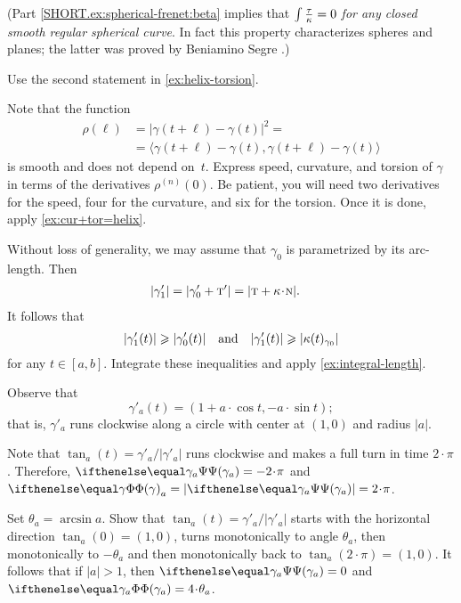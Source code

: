 \begin{multicols}{2}
(Part \ref{SHORT.ex:spherical-frenet:beta} implies that \textit{$\int\tfrac{\tau}{\kappa}=0$ for any closed smooth regular spherical curve}.
In fact this property characterizes spheres and planes; the latter was proved by Beniamino Segre \cite{segre}.)

 Use the second statement in \ref{ex:helix-torsion}.

 Note that the function
\begin{align*}
\rho(\ell)&=|\gamma(t+\ell)-\gamma(t)|^2=
\\
&=\langle \gamma(t+\ell)-\gamma(t),\gamma(t+\ell)-\gamma(t)\rangle
\end{align*}
is smooth and does not depend on~$t$.
Express speed, curvature, and torsion of $\gamma$ in terms of the derivatives $\rho^{(n)}(0)$.
Be patient, you will need two derivatives for the speed,
four for the curvature,
and six for the torsion.
Once it is done, apply \ref{ex:cur+tor=helix}.


\setcounter{eqtn}{0}



Without loss of generality, we may assume that $\gamma_0$ is parametrized by its arc-length.
Then
\begin{align*}
|\gamma_1'|&=|\gamma_0'+\tan'|=|\tan+\kur\cdot\norm|.
\end{align*}
It follows that
\[|\gamma_1'(t)|\geqslant|\gamma_0'(t)|
\quad\text{and}\quad
|\gamma_1'(t)|\geqslant|\kappa(t)_{\gamma_0}|
\]
for any $t\in[a,b]$.
Integrate these inequalities and apply 
\ref{ex:integral-length}.


Observe that 
\[\gamma'_a(t)=(1+a\cdot \cos t, -a\cdot \sin t);\]
that is, $\gamma'_a$ runs clockwise along a circle with center at $(1,0)$ and radius $\vert a \vert$.

 Note that $\tan_a(t)=\gamma'_a/|\gamma'_a|$ runs clockwise and makes a full turn in time $2\cdot\pi$.
Therefore, $\tgc{\gamma_a}=-2\cdot\pi$ and $\tc\gamma_a\z=|\tgc{\gamma_a}|=2\cdot\pi$.

Set $\theta_a=\arcsin a$.
Show that $\tan_a(t)=\gamma'_a/|\gamma'_a|$ starts with the horizontal direction $\tan_a(0)=(1,0)$, turns monotonically to angle $\theta_a$, then monotonically to $-\theta_a$ and then monotonically back to $\tan_a(2\cdot\pi)=(1,0)$.
It follows that if $|a|>1$, then
$\tgc{\gamma_a}=0$ and $\tc{\gamma_a}=4\cdot\theta_a$.


\end{multicols}
